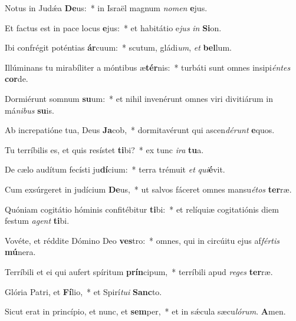 \item Notus in Judǽa \textbf{De}us:~* in Israël magnum \textit{no}\textit{men} \textbf{e}jus.

\item Et factus est in pace locus \textbf{e}jus:~* et habitátio e\textit{jus} \textit{in} \textbf{Si}on.

\item Ibi confrégit poténtias \textbf{ár}cuum:~* scutum, gládi\textit{um}, \textit{et} \textbf{bel}lum.

\item Illúminans tu mirabíliter a móntibus æ\textbf{tér}nis:~* turbáti sunt omnes insipi\textit{én}\textit{tes} \textbf{cor}de.

\item Dormiérunt somnum \textbf{su}um:~* et nihil invenérunt omnes viri divitiárum in má\textit{ni}\textit{bus} \textbf{su}is.

\item Ab increpatióne tua, Deus \textbf{Ja}cob,~* dormitavérunt qui ascen\textit{dé}\textit{runt} \textbf{e}quos.

\item Tu terríbilis es, et quis resístet \textbf{ti}bi?~* ex tunc \textit{i}\textit{ra} \textbf{tu}a.

\item De cælo audítum fecísti ju\textbf{dí}cium:~* terra trémuit \textit{et} \textit{qui}\textbf{é}vit.

\item Cum exsúrgeret in judícium \textbf{De}us,~* ut salvos fáceret omnes mansu\textit{é}\textit{tos} \textbf{ter}ræ.

\item Quóniam cogitátio hóminis confitébitur \textbf{ti}bi:~* et relíquiæ cogitatiónis diem festum \textit{a}\textit{gent} \textbf{ti}bi.

\item Vovéte, et réddite Dómino Deo \textbf{ves}tro:~* omnes, qui in circúitu ejus af\textit{fér}\textit{tis} \textbf{mú}nera.

\item Terríbili et ei qui aufert spíritum \textbf{prín}cipum,~* terríbili apud \textit{re}\textit{ges} \textbf{ter}ræ.

\item Glória Patri, et \textbf{Fí}lio,~* et Spirí\textit{tu}\textit{i} \textbf{Sanc}to.

\item Sicut erat in princípio, et nunc, et \textbf{sem}per,~* et in sǽcula sæcu\textit{ló}\textit{rum}. \textbf{A}men.
